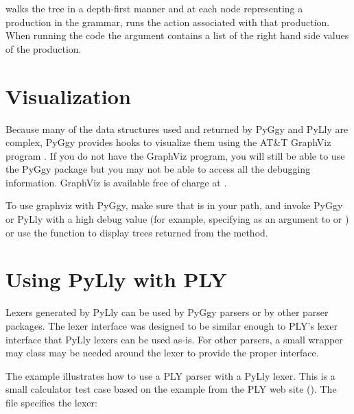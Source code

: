 walks the tree in a depth-first manner and
at each node representing a production in the grammar, runs
the action associated with that production.  When running the
code the  argument contains a list of the right
hand side values of the production.



\section{Visualization}
Because many of the data structures used and returned by PyGgy and
PyLly are complex, PyGgy provides hooks to visualize them using
the AT\&T GraphViz program .  If you do not have
the GraphViz program, you will still be able to use the PyGgy package
but you may not be able to access all the debugging information.
GraphViz is available free of charge at .

To use graphviz with PyGgy, make sure that  is in your path,
and invoke PyGgy or PyLly with a high debug value (for example,
specifying  as an argument to  or 
) or use the function  to
display trees returned from the  method.


\section{Using PyLly with PLY}
Lexers generated by PyLly can be used by PyGgy parsers or by
other parser packages.  The lexer interface was designed to be
similar enough to PLY's lexer interface that PyLly lexers can
be used as-is.  For other parsers, a small wrapper may class
may be needed around the lexer to provide the proper interface.

The  example illustrates how to use
a PLY parser with a PyLly lexer.  This is a small calculator test 
case based on the example from the PLY web site 
().
The  file specifies the lexer:

